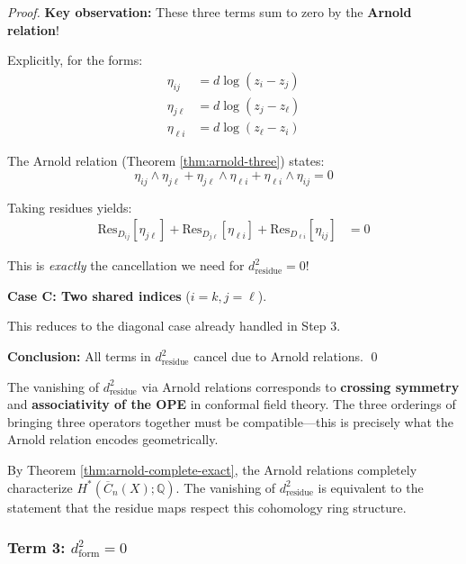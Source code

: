 \begin{proof}
\textbf{Key observation:} These three terms sum to zero by the \textbf{Arnold relation}!

Explicitly, for the forms:
\begin{align}
\eta_{ij} &= d\log(z_i - z_j)\\
\eta_{j\ell} &= d\log(z_j - z_\ell)\\
\eta_{\ell i} &= d\log(z_\ell - z_i)
\end{align}

The Arnold relation (Theorem \ref{thm:arnold-three}) states:
$$\eta_{ij} \wedge \eta_{j\ell} + \eta_{j\ell} \wedge \eta_{\ell i} + \eta_{\ell i} 
\wedge \eta_{ij} = 0$$

Taking residues yields:
\begin{align}
\text{Res}_{D_{ij}}[\eta_{j\ell}] + \text{Res}_{D_{j\ell}}[\eta_{\ell i}] + 
\text{Res}_{D_{\ell i}}[\eta_{ij}] &= 0 \label{eq:arnold-residue-version}
\end{align}

This is \emph{exactly} the cancellation we need for $d_{\text{residue}}^2 = 0$!

\textbf{Case C: Two shared indices} ($i=k, j=\ell$).

This reduces to the diagonal case already handled in Step 3.

\textbf{Conclusion:} All terms in $d_{\text{residue}}^2$ cancel due to Arnold relations. \qed
\end{proof}

\begin{remark}
The vanishing of $d_{\text{residue}}^2$ via Arnold relations corresponds to 
\textbf{crossing symmetry} and \textbf{associativity of the OPE} in conformal field theory.
The three orderings of bringing three operators together must be compatible---this is
precisely what the Arnold relation encodes geometrically.
\end{remark}

\begin{remark}
By Theorem \ref{thm:arnold-complete-exact}, the Arnold relations completely characterize
$H^*(\overline{C}_n(X); \mathbb{Q})$. The vanishing of $d_{\text{residue}}^2$ is
equivalent to the statement that the residue maps respect this cohomology ring structure.
\end{remark}

\subsubsection{Term 3: $d_{\text{form}}^2 = 0$}

